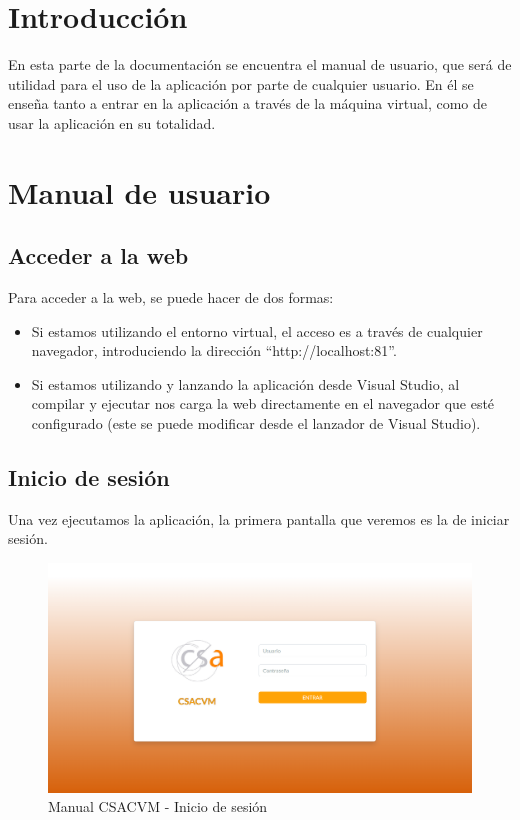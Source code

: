 
\section{Introducción}
En esta parte de la documentación se encuentra el manual de usuario, que será de utilidad para
el uso de la aplicación por parte de cualquier usuario. En él se enseña tanto a entrar en la aplicación a través de la máquina virtual, como de usar la aplicación en su totalidad.

\section{Manual de usuario}

\subsection{Acceder a la web}
Para acceder a la web, se puede hacer de dos formas:
\begin{itemize}
    \tightlist
    \item Si estamos utilizando el entorno virtual, el acceso es a través de cualquier navegador, introduciendo la dirección ``http://localhost:81''.
    \item Si estamos utilizando y lanzando la aplicación desde Visual Studio, al compilar y ejecutar nos carga la web directamente en el navegador que esté configurado (este se puede modificar desde el lanzador de Visual Studio).
\end{itemize}

\subsection{Inicio de sesión}
Una vez ejecutamos la aplicación, la primera pantalla que veremos es la de iniciar sesión.

\begin{figure}
    \centering
    \includegraphics[width=\linewidth]{img/ManualUsuario/Manual01.png}
    \caption{Manual CSACVM - Inicio de sesión}
\end{figure}

